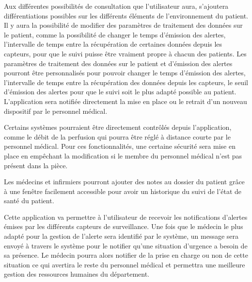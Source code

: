 Aux différentes possibilités de consultation que l’utilisateur aura, s’ajoutera différentiations possibles sur les différents
éléments de l’environnement du patient. Il y aura la possibilité de modifier des paramètres de traitement des données sur le
patient, comme la possibilité de changer le temps d’émission des alertes, l’intervalle de temps entre la récupération de certaines
données depuis les capteurs, pour que le suivi puisse être vraiment propre à chacun des patients. Les paramètres de
traitement des données sur le patient et d’émission des alertes pourront être personnalisés pour pouvoir changer le temps
d’émission des alertes, l’intervalle de temps entre la récupération des données depuis les capteurs, le seuil d’émission des
alertes pour que le suivi soit le plus adapté possible au patient. L’application sera notifiée directement la mise en place ou le
retrait d’un nouveau dispositif par le personnel médical. 

Certains systèmes pourraient être directement contrôlés depuis l’application, comme le débit de la perfusion qui pourra être réglé à distance courte par le personnel médical. Pour ces fonctionnalités, une certaine sécurité sera mise en place en empêchant la modification si le membre du personnel médical n’est pas présent dans la pièce.

Les médecins et infirmiers pourront ajouter des notes au dossier du patient grâce à une fenêtre facilement accessible pour avoir un historique du suivi de l’état de santé du patient.

Cette application va permettre à l’utilisateur de recevoir les notifications d’alertes émises par les différents capteurs de
surveillance. Une fois que le médecin le plus adapté pour la gestion de l’alerte sera identifié par le système, un message sera
envoyé à travers le système pour le notifier  qu’une situation d’urgence a besoin de sa présence. Le médecin pourra alors notifier
de la prise en charge ou non de cette situation ce qui avertira le reste du personnel médical et permettra une meilleure gestion des ressources humaines du département.
